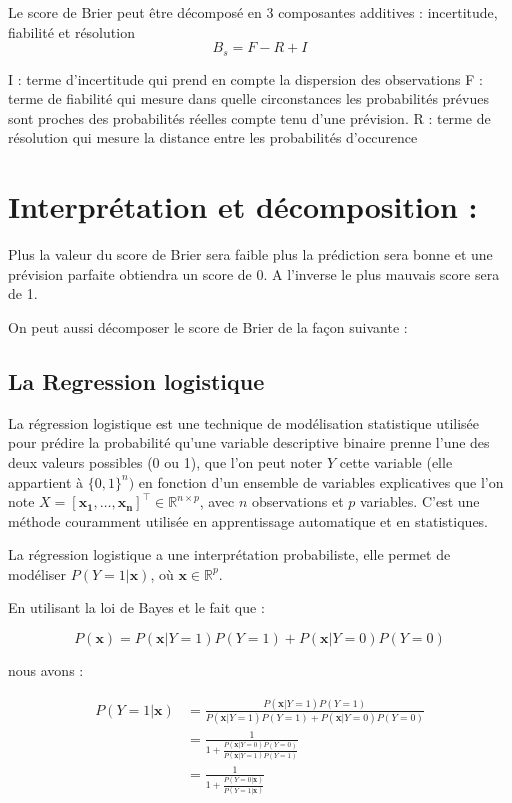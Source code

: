 \documentclass[
  letterpaper,
  DIV=11,
  numbers=noendperiod]{scrartcl}
\begin{document}
Le score de Brier peut être décomposé en 3 composantes additives :
incertitude, fiabilité et résolution \[
B_s = F - R + I
\]

I : terme d'incertitude qui prend en compte la dispersion des
observations F : terme de fiabilité qui mesure dans quelle circonstances
les probabilités prévues sont proches des probabilités réelles compte
tenu d'une prévision. R : terme de résolution qui mesure la distance
entre les probabilités d'occurence

\hypertarget{interpruxe9tation-et-duxe9composition}{%
\section{Interprétation et décomposition
:}\label{interpruxe9tation-et-duxe9composition}}

Plus la valeur du score de Brier sera faible plus la prédiction sera
bonne et une prévision parfaite obtiendra un score de 0. A l'inverse le
plus mauvais score sera de 1.

On peut aussi décomposer le score de Brier de la façon suivante :

\hypertarget{la-regression-logistique}{%
\subsection{La Regression logistique}\label{la-regression-logistique}}

La régression logistique est une technique de modélisation statistique
utilisée pour prédire la probabilité qu'une variable descriptive binaire
prenne l'une des deux valeurs possibles (0 ou 1), que l'on peut noter
\(Y\) cette variable (elle appartient à \(\{0, 1\}^n)\) en fonction d'un
ensemble de variables explicatives que l'on note
\(X = \left[\mathbf{x_1}, \ldots,\mathbf{x_n} \right]^\top \in \mathbb{R}^{n \times p}\),
avec \(n\) observations et \(p\) variables. C'est une méthode couramment
utilisée en apprentissage automatique et en statistiques.

La régression logistique a une interprétation probabiliste, elle permet
de modéliser \(P(Y = 1 | \mathbf{x})\), où
\(\mathbf{x}\in \mathbb{R}^{p}\).

En utilisant la loi de Bayes et le fait que :

\[
P(\mathbf{x}) = P(\mathbf{x}|Y=1)P(Y=1) + P(\mathbf{x}|Y=0)P(Y=0)
\]

nous avons :

\begin{align*}
P(Y=1|\mathbf{x})
& = \frac{P(\mathbf{x}|Y=1)P(Y=1)}{P(\mathbf{x}|Y=1)P(Y=1) + P(\mathbf{x}|Y=0)P(Y=0)}\\
& = \frac{1}{1 + \frac{P(\mathbf{x}|Y=0)P(Y=0)}{P(\mathbf{x}|Y=1)P(Y=1)}} \\
& = \frac{1}{1 + \frac{P(Y=0|\mathbf{x})}{P(Y=1|\mathbf{x})}}
\end{align*}
\end{document}

